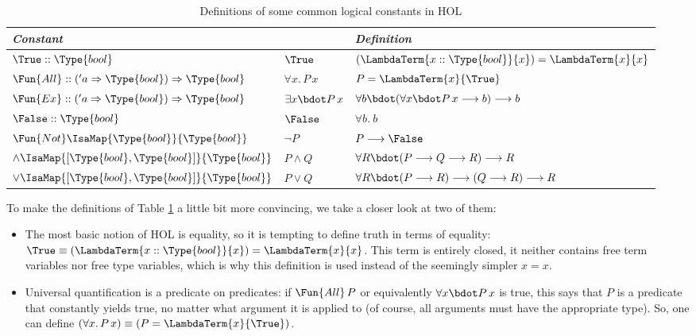 \begin{table}
  \centering \renewcommand{\arraystretch}{1.3}
  \begin{tabular}{|l|l@{$\quad\equiv\quad$}l|}\hline
    \multicolumn{2}{|l}{\emph{Constant}} & \emph{Definition} \\\hline
    $\True :: \Type{bool}$ &
    $\True$           & $(\LambdaTerm{x::\Type{bool}}{x}) =
    \LambdaTerm{x}{x}$\\\hline 
    $\Fun{All} :: ('a \Rightarrow \Type{bool}) \Rightarrow \Type{bool}$ &
    $\forall x.\, P\, x$      & $P = \LambdaTerm{x}{\True}$\\\hline
    $\Fun{Ex} :: ('a \Rightarrow\Type{bool}) \Rightarrow \Type{bool}$ &
    $\exists x\bdot P\, x$    & $\forall b\bdot (\forall x\bdot P\, x \longrightarrow b) \longrightarrow b$\\\hline
    $\False :: \Type{bool}$ &
    $\False$          & $\forall b.\ b$\\\hline
    $\Fun{Not} \IsaMap{\Type{bool}}{\Type{bool}}$ &
    $\lnot P$            & $P \longrightarrow \False$\\\hline
    $\land  \IsaMap{[\Type{bool}, \Type{bool}]}{\Type{bool}}$ &
    $P \land Q$          & $\forall R\bdot (P \longrightarrow Q \longrightarrow R) \longrightarrow R$\\\hline
    $\lor \IsaMap{[\Type{bool},\Type{bool}]}{\Type{bool}}$ &
    $P \lor Q$          & $\forall R\bdot (P\longrightarrow R)\longrightarrow(Q\longrightarrow R)\longrightarrow R$\\\hline
  \end{tabular}
  \caption{Definitions of some common logical constants in HOL}
  \label{tab:defn-logic-op}
\end{table}

\begin{expl}
  To make the definitions of Table \ref{tab:defn-logic-op} a little bit more
  convincing, we take a closer look at two of them:
  \begin{itemize}
  \item The most basic notion of HOL is equality, so it is tempting to define
    truth in terms of equality: $\True \equiv (\LambdaTerm{x::\Type{bool}}{x}) =
    \LambdaTerm{x}{x}$. This term is entirely closed, \IE it neither contains
    free term variables nor free type variables, which is why this definition is
    used instead of the seemingly simpler $x=x$.
  \item Universal quantification is a predicate on predicates: if $\Fun{All}\,P$
    or equivalently $\forall x\bdot P\,x$ is true, this says that $P$ is a predicate
    that constantly yields true, no matter what argument it is applied to (of
    course, all arguments must have the appropriate type). So, one can define
    $(\forall x.\, P\, x) \equiv (P = \LambdaTerm{x}{\True})$.
  \end{itemize}
\end{expl}




